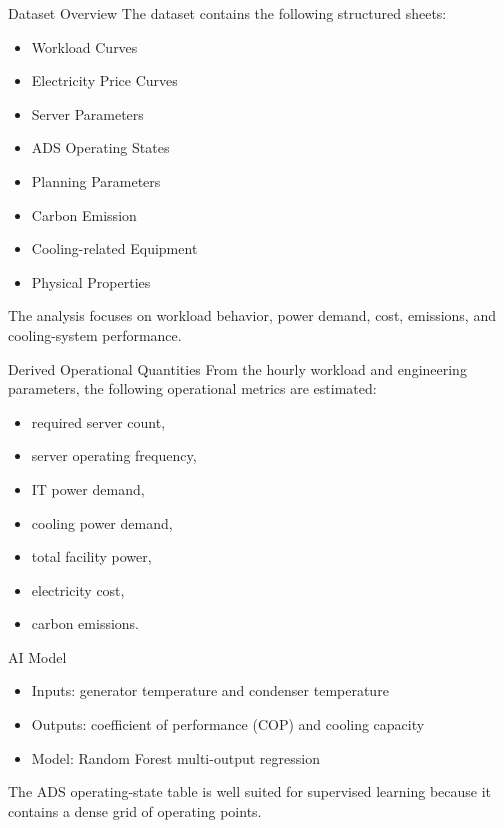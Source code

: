 \documentclass[
  ignorenonframetext,
  aspectratio=169,
]{beamer}
\providecommand{\tightlist}{%
  \setlength{\itemsep}{0pt}\setlength{\parskip}{0pt}}\usepackage{longtable,booktabs,array}
\begin{document}
\begin{frame}{Dataset Overview}
\label{dataset-overview}
The dataset contains the following structured sheets:

\begin{itemize}
\tightlist
\item
  Workload Curves
\item
  Electricity Price Curves
\item
  Server Parameters
\item
  ADS Operating States
\item
  Planning Parameters
\item
  Carbon Emission
\item
  Cooling-related Equipment
\item
  Physical Properties
\end{itemize}

\vspace{0.8em}

The analysis focuses on workload behavior, power demand, cost,
emissions, and cooling-system performance.
\end{frame}

\begin{frame}{Derived Operational Quantities}
\label{derived-operational-quantities}
From the hourly workload and engineering parameters, the following
operational metrics are estimated:

\begin{itemize}
\tightlist
\item
  required server count,
\item
  server operating frequency,
\item
  IT power demand,
\item
  cooling power demand,
\item
  total facility power,
\item
  electricity cost,
\item
  carbon emissions.
\end{itemize}
\end{frame}

\begin{frame}{AI Model}
\label{ai-model}
\begin{itemize}
  \item Inputs: generator temperature and condenser temperature
  \item Outputs: coefficient of performance (COP) and cooling capacity
  \item Model: Random Forest multi-output regression
\end{itemize}

\vspace{0.8em}

The ADS operating-state table is well suited for supervised learning
because it contains a dense grid of operating points.
\end{frame}
\end{document}
